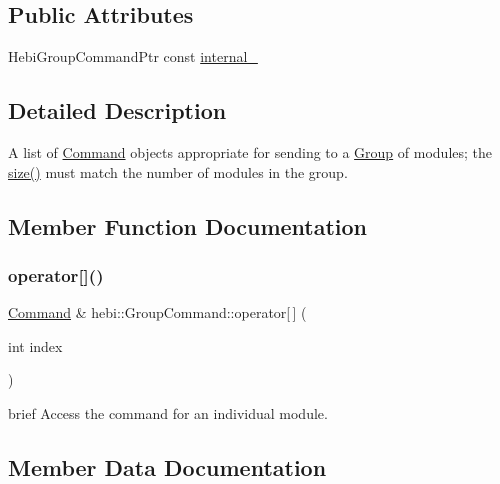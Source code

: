 \subsection*{Public Attributes}
\begin{DoxyCompactItemize}
\item 
Hebi\+Group\+Command\+Ptr const \hyperlink{classhebi_1_1GroupCommand_aa3380b0b6c64b2d03df3d5d69a884a12}{internal\+\_\+}
\end{DoxyCompactItemize}


\subsection{Detailed Description}
A list of \hyperlink{classhebi_1_1Command}{Command} objects appropriate for sending to a \hyperlink{classhebi_1_1Group}{Group} of modules; the \hyperlink{classhebi_1_1GroupCommand_a171fc503a522b3ab1554c42d373f1f0a}{size()} must match the number of modules in the group. 

\subsection{Member Function Documentation}
\mbox{\label{classhebi_1_1GroupCommand_afa9edb2ec0c411b4d9ca701350339a90}} 
\subsubsection{\texorpdfstring{operator[]()}{operator[]()}}
{\footnotesize\ttfamily \hyperlink{classhebi_1_1Command}{Command} \& hebi\+::\+Group\+Command\+::operator\mbox{[}$\,$\mbox{]} (\begin{DoxyParamCaption}\item[{int}]{index }\end{DoxyParamCaption})}

brief Access the command for an individual module. 

\subsection{Member Data Documentation}
\mbox{\label{classhebi_1_1GroupCommand_aa3380b0b6c64b2d03df3d5d69a884a12}} 
